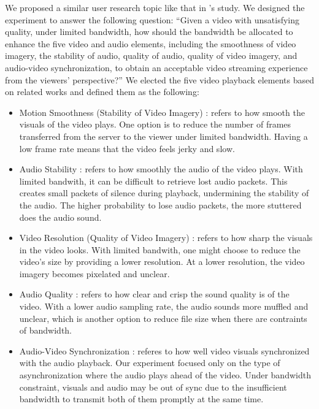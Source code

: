 We proposed a similar user research topic like that in \textcite{oeldorf2012bad}'s study. We designed the experiment to answer the following question: ``Given a video with unsatisfying quality, under limited bandwidth, how should the bandwidth be allocated to enhance the five video and audio elements, including the smoothness of video imagery, the stability of audio, quality of audio, quality of video imagery, and audio-video synchronization, to obtain an acceptable video streaming experience from the viewers' perspective?'' We elected the five video playback elements based on related works and defined them as the following: 

\begin{itemize}
    \item Motion Smoothness (Stability of Video Imagery) \cite{claypool1999effects}: refers to how smooth the visuals of the video plays. One option is to reduce the number of frames transferred from the server to the viewer under limited bandwidth. Having a low frame rate means that the video feels jerky and slow.
    \item Audio Stability \cite{claypool1999effects}: refers to how smoothly the audio of the video plays. With limited bandwith, it can be difficult to retrieve lost audio packets. This creates small packets of silence during playback, undermining the stability of the audio. The higher probability to lose audio packets, the more stuttered does the audio sound.
    \item Video Resolution (Quality of Video Imagery) \cite{oeldorf2012bad, knoche2008low}: refers to how sharp the visuals in the video looks. With limited bandwith, one might choose to reduce the video's size by providing a lower resolution. At a lower resolution, the video imagery becomes pixelated and unclear. 
    \item Audio Quality \cite{oeldorf2012bad, noll1993wideband}: refers to how clear and crisp the sound quality is of the video. With a lower audio sampling rate, the audio sounds more muffled and unclear, which is another option to reduce file size when there are contraints of bandwidth.
    \item Audio-Video Synchronization \cite{steinmetz1996human}: referes to how well video visuals synchronized with the audio playback. Our experiment focused only on the type of asynchronization where the audio plays ahead of the video. Under bandwidth constraint, visuals and audio may be out of sync due to the insufficient bandwidth to transmit both of them promptly at the same time.
\end{itemize}


